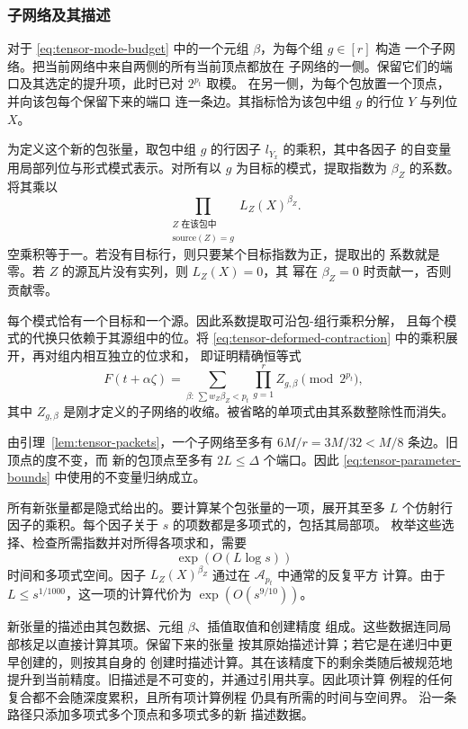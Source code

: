 \subsubsection{子网络及其描述}
\label{subsec:tensor-children}

对于 \eqref{eq:tensor-mode-budget} 中的一个元组 $\beta$，为每个组 $g\in[r]$ 构造
一个子网络。把当前网络中来自两侧的所有当前顶点都放在
子网络的一侧。保留它们的端口及其选定的提升项，此时已对 $2^{p_t}$ 取模。
在另一侧，为每个包放置一个顶点，并向该包每个保留下来的端口
连一条边。其指标恰为该包中组 $g$ 的行位 $Y$ 与列位 $X$。

为定义这个新的包张量，取包中组 $g$ 的行因子 $l_{Y_x}$ 的乘积，其中各因子
的自变量用局部列位与形式模式表示。对所有以 $g$ 为目标的模式，提取指数为
$\beta_Z$ 的系数。将其乘以
\[
 \prod_{\substack{Z\text{ 在该包中}\\
                  \text{source}(Z)=g}}L_Z(X)^{\beta_Z}.
\]
空乘积等于一。若没有目标行，则只要某个目标指数为正，提取出的
系数就是零。若 $Z$ 的源瓦片没有实列，则 $L_Z(X)=0$，其
幂在 $\beta_Z=0$ 时贡献一，否则贡献零。

每个模式恰有一个目标和一个源。因此系数提取可沿包-组行乘积分解，
且每个模式的代换只依赖于其源组中的位。将
\eqref{eq:tensor-deformed-contraction} 中的乘积展开，再对组内相互独立的位求和，
即证明精确恒等式
\begin{equation}\label{eq:tensor-recursion-identity}
 F(t+\alpha\zeta)
   =\sum_{\beta:\,\sum w_Z\beta_Z<p_t}
                       \prod_{g=1}^r Z_{g,\beta}
                  \pmod {2^{p_t}},
\end{equation}
其中 $Z_{g,\beta}$ 是刚才定义的子网络的收缩。被省略的单项式由其系数整除性而消失。

由引理~\ref{lem:tensor-packets}，一个子网络至多有
$6M/r=3M/32<M/8$ 条边。旧顶点的度不变，而
新的包顶点至多有 $2L\le\Delta$ 个端口。因此
\eqref{eq:tensor-parameter-bounds} 中使用的不变量归纳成立。

所有新张量都是隐式给出的。要计算某个包张量的一项，展开其至多 $L$ 个仿射行
因子的乘积。每个因子关于 $s$ 的项数都是多项式的，包括其局部项。
枚举这些选择、检查所需指数并对所得各项求和，需要
\[
 \exp(O(L\log s))
\]
时间和多项式空间。因子 $L_Z(X)^{\beta_Z}$ 通过在 $\mathcal A_{p_t}$ 中通常的反复平方
计算。由于 $L\le s^{1/1000}$，这一项的计算代价为
$\exp(O(s^{9/10}))$。

新张量的描述由其包数据、元组 $\beta$、插值取值和创建精度
组成。这些数据连同局部核足以直接计算其项。保留下来的张量
按其原始描述计算；若它是在递归中更早创建的，则按其自身的
创建时描述计算。其在该精度下的剩余类随后被规范地
提升到当前精度。旧描述是不可变的，并通过引用共享。因此项计算
例程的任何复合都不会随深度累积，且所有项计算例程
仍具有所需的时间与空间界。
沿一条路径只添加多项式多个顶点和多项式多的新
描述数据。

